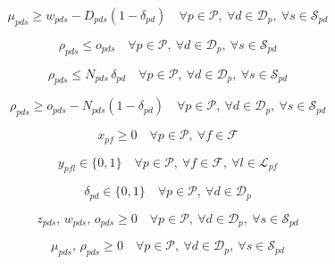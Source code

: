 \documentclass{article}
\begin{document}
\begin{equation}
\mu_{pds} \ge w_{pds} - D_{pds}(1 - \delta_{pd})
\quad \forall p \in \mathcal{P},\ \forall d \in \mathcal{D}_p,\ \forall s \in \mathcal{S}_{pd}
\tag{22p}
\end{equation}

\begin{equation}
\rho_{pds} \le o_{pds}
\quad \forall p \in \mathcal{P},\ \forall d \in \mathcal{D}_p,\ \forall s \in \mathcal{S}_{pd}
\tag{22q}
\end{equation}

\begin{equation}
\rho_{pds} \le N_{pds}\, \delta_{pd}
\quad \forall p \in \mathcal{P},\ \forall d \in \mathcal{D}_p,\ \forall s \in \mathcal{S}_{pd}
\tag{22r}
\end{equation}

\begin{equation}
\rho_{pds} \ge o_{pds} - N_{pds}(1 - \delta_{pd})
\quad \forall p \in \mathcal{P},\ \forall d \in \mathcal{D}_p,\ \forall s \in \mathcal{S}_{pd}
\tag{22s}
\end{equation}

\begin{equation}
x_{pf} \ge 0
\quad \forall p \in \mathcal{P},\ \forall f \in \mathcal{F}
\tag{22j}
\end{equation}

\begin{equation}
y_{pfl} \in \{0,1\}
\quad \forall p \in \mathcal{P},\ \forall f \in \mathcal{F},\ \forall l \in \mathcal{L}_{pf}
\tag{22k}
\end{equation}

\begin{equation}
\delta_{pd} \in \{0,1\}
\quad \forall p \in \mathcal{P},\ \forall d \in \mathcal{D}_p
\tag{22l}
\end{equation}

\begin{equation}
z_{pds},\, w_{pds},\, o_{pds} \ge 0
\quad \forall p \in \mathcal{P},\ \forall d \in \mathcal{D}_p,\ \forall s \in \mathcal{S}_{pd}
\tag{22m}
\end{equation}

\begin{equation}
\mu_{pds},\, \rho_{pds} \ge 0
\quad \forall p \in \mathcal{P},\ \forall d \in \mathcal{D}_p,\ \forall s \in \mathcal{S}_{pd}
\tag{Lin-Dom}
\end{equation}
\end{document}
